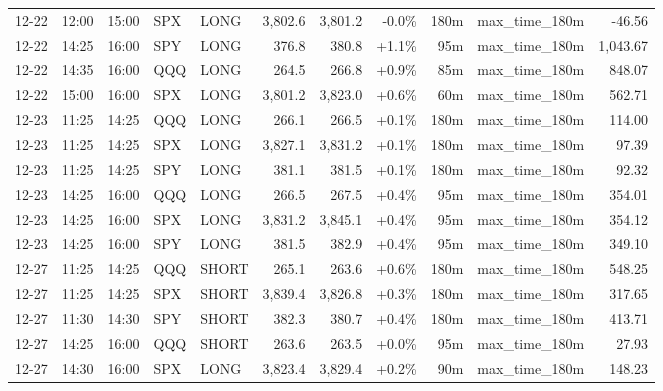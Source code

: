 \documentclass[11pt,a4paper,twoside]{article}
\begin{document}
\begin{center}
\begin{longtable}{>{\color{txtmain}}l l l l l r r r r >{\color{txtmain}}l r}
12-22 & 12:00 & 15:00 & SPX & LONG & 3,802.6 & 3,801.2 & \textcolor{lossred}{-0.0\%} & 180m & max\_time\_180m & \textcolor{lossred}{-46.56} \\
12-22 & 14:25 & 16:00 & SPY & LONG & 376.8 & 380.8 & \textcolor{wingreen}{+1.1\%} & 95m & max\_time\_180m & \textcolor{wingreen}{1,043.67} \\
12-22 & 14:35 & 16:00 & QQQ & LONG & 264.5 & 266.8 & \textcolor{wingreen}{+0.9\%} & 85m & max\_time\_180m & \textcolor{wingreen}{848.07} \\
12-22 & 15:00 & 16:00 & SPX & LONG & 3,801.2 & 3,823.0 & \textcolor{wingreen}{+0.6\%} & 60m & max\_time\_180m & \textcolor{wingreen}{562.71} \\
12-23 & 11:25 & 14:25 & QQQ & LONG & 266.1 & 266.5 & \textcolor{wingreen}{+0.1\%} & 180m & max\_time\_180m & \textcolor{wingreen}{114.00} \\
12-23 & 11:25 & 14:25 & SPX & LONG & 3,827.1 & 3,831.2 & \textcolor{wingreen}{+0.1\%} & 180m & max\_time\_180m & \textcolor{wingreen}{97.39} \\
12-23 & 11:25 & 14:25 & SPY & LONG & 381.1 & 381.5 & \textcolor{wingreen}{+0.1\%} & 180m & max\_time\_180m & \textcolor{wingreen}{92.32} \\
12-23 & 14:25 & 16:00 & QQQ & LONG & 266.5 & 267.5 & \textcolor{wingreen}{+0.4\%} & 95m & max\_time\_180m & \textcolor{wingreen}{354.01} \\
12-23 & 14:25 & 16:00 & SPX & LONG & 3,831.2 & 3,845.1 & \textcolor{wingreen}{+0.4\%} & 95m & max\_time\_180m & \textcolor{wingreen}{354.12} \\
12-23 & 14:25 & 16:00 & SPY & LONG & 381.5 & 382.9 & \textcolor{wingreen}{+0.4\%} & 95m & max\_time\_180m & \textcolor{wingreen}{349.10} \\
12-27 & 11:25 & 14:25 & QQQ & SHORT & 265.1 & 263.6 & \textcolor{wingreen}{+0.6\%} & 180m & max\_time\_180m & \textcolor{wingreen}{548.25} \\
12-27 & 11:25 & 14:25 & SPX & SHORT & 3,839.4 & 3,826.8 & \textcolor{wingreen}{+0.3\%} & 180m & max\_time\_180m & \textcolor{wingreen}{317.65} \\
12-27 & 11:30 & 14:30 & SPY & SHORT & 382.3 & 380.7 & \textcolor{wingreen}{+0.4\%} & 180m & max\_time\_180m & \textcolor{wingreen}{413.71} \\
12-27 & 14:25 & 16:00 & QQQ & SHORT & 263.6 & 263.5 & \textcolor{wingreen}{+0.0\%} & 95m & max\_time\_180m & \textcolor{wingreen}{27.93} \\
12-27 & 14:30 & 16:00 & SPX & LONG & 3,823.4 & 3,829.4 & \textcolor{wingreen}{+0.2\%} & 90m & max\_time\_180m & \textcolor{wingreen}{148.23} \\

\end{longtable}
\end{center}
\end{document}
